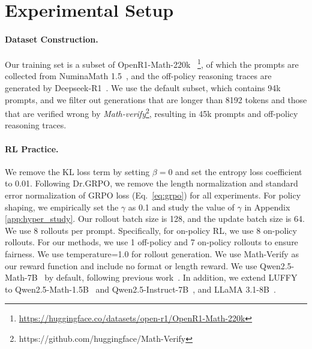\documentclass{article}
\begin{document}







\section{Experimental Setup}
\label{sec:setup}
\vspace{-0.5\baselineskip}
\paragraph{Dataset Construction.}
Our training set is a subset of OpenR1-Math-220k~\cite{openr1}
\footnote{\url{https://huggingface.co/datasets/open-r1/OpenR1-Math-220k}}, of which the prompts are collected from NuminaMath 1.5~\cite{numina_math_datasets}, and the off-policy reasoning traces are generated by Deepseek-R1~\cite{r1}. 
We use the default subset, which contains 94k prompts, and we filter out generations that are longer than 8192 tokens and those that are verified wrong by \textit{Math-verify}\footnote{https://github.com/huggingface/Math-Verify}, resulting in 45k prompts and off-policy reasoning traces. 
\vspace{-0.5\baselineskip}
\paragraph{RL Practice.}
We remove the KL loss term by setting $\beta=0$ and set the entropy loss coefficient to 0.01. 
Following Dr.GRPO\cite{drgrpo}, we remove the length normalization and standard error normalization of GRPO loss (Eq.~\ref{eq:grpo}) for all experiments. 
For policy shaping, we empirically set the $\gamma$ as 0.1 and study the value of $\gamma$ in Appendix \ref{app:hyper_study}.
Our rollout batch size is 128, and the update batch size is 64. We use 8 rollouts per prompt. 
Specifically, for on-policy RL, we use 8 on-policy rollouts. For our methods, we use 1 off-policy and 7 on-policy rollouts to ensure fairness. 
We use temperature=1.0 for rollout generation. We use Math-Verify as our reward function and include no format or length reward. 
We use Qwen2.5-Math-7B~\cite{qwen2.5_math} by default, following previous work~\cite{prime,simplerl,drgrpo}. In addition, we extend LUFFY to Qwen2.5-Math-1.5B~\cite{qwen2.5_math} and Qwen2.5-Instruct-7B~\cite{qwen2.5}, and LLaMA 3.1-8B~\cite{llama3}.
\vspace{-0.5\baselineskip}
\end{document}
